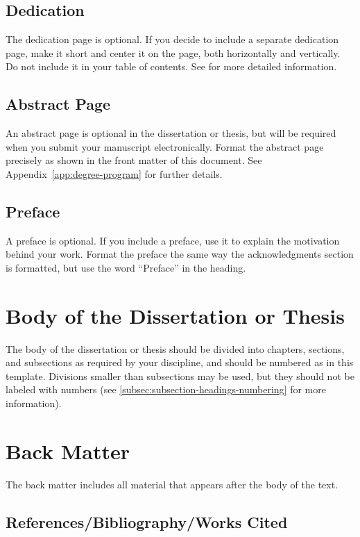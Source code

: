 \subsection{Dedication}

The dedication page is optional.
If you decide to include a separate dedication page, make it short and center it on the page, both horizontally and vertically.
Do not include it in your table of contents.
See  for more detailed information.

\subsection{Abstract Page}

An abstract page is optional in the dissertation or thesis, but will be required when you submit your manuscript electronically.
Format the abstract page precisely as shown in the front matter of this document.
See Appendix~\ref{app:degree-program} for further details.

\subsection{Preface}

A preface is optional.
If you include a preface, use it to explain the motivation behind your work.
Format the preface the same way the acknowledgments section is formatted, but use the word ``Preface'' in the heading.

\section{Body of the Dissertation or Thesis}

The body of the dissertation or thesis should be divided into chapters, sections, and subsections as required by your discipline, and should be numbered as in this template.
Divisions smaller than subsections may be used, but they should not be labeled with numbers (see \ref{subsec:subsection-headings-numbering} for more information).

\section{Back Matter}

The back matter includes all material that appears after the body of the text.

\subsection{References/Bibliography/Works Cited}

